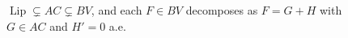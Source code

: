 \documentclass[a4paper]{article}
\begin{document}
\thispagestyle{empty}
\begin{figure}[H]
  \centering
  
  \caption{$\operatorname{Lip}\subsetneq AC\subsetneq BV$, and each $F\in BV$ decomposes as $F=G+H$ with $G\in AC$ and $H'=0$ a.e.}
\end{figure}
\end{document}
